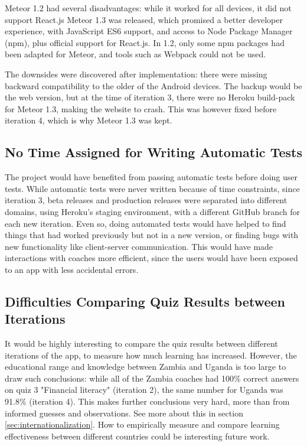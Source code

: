 Meteor 1.2 had several disadvantages: while it worked for all devices, it did not support React.js Meteor 1.3 was released, which promised a better developer experience, with JavaScript ES6 support, and access to Node Package Manager (npm), plus official support for React.js. In 1.2, only some npm packages had been adapted for Meteor, and tools such as Webpack could not be used.

The downsides were discovered after implementation: there were missing backward compatibility to the older of the Android devices. The backup would be the web version, but at the time of iteration 3, there were no Heroku build-pack for Meteor 1.3, making the website to crash. This was however fixed before iteration 4, which is why Meteor 1.3 was kept.

\subsection{No Time Assigned for Writing Automatic Tests}
The project would have benefited from passing automatic tests before doing user tests. While automatic tests were never written because of time constraints, since iteration 3, beta releases and production releases were separated into different domains, using Heroku's staging environment, with a different GitHub branch for each new iteration. Even so, doing automated tests would have helped to find things that had worked previously but not in a new version, or finding bugs with new functionality like client-server communication. This would have made interactions with coaches more efficient, since the users would have been exposed to an app with less accidental errors.

\subsection{Difficulties Comparing Quiz Results between Iterations}
It would be highly interesting to compare the quiz results between different iterations of the app, to measure how much learning has increased. However, the educational range and knowledge between Zambia and Uganda is too large to draw such conclusions: while all of the Zambia coaches had 100\% correct answers on quiz 3 "Financial literacy" (iteration 2), the same number for Uganda was 91.8\% (iteration 4). This makes further conclusions very hard, more than from informed guesses and observations. See more about this in section \ref{sec:internationalization}. How to empirically measure and compare learning effectiveness between different countries could be interesting future work.

